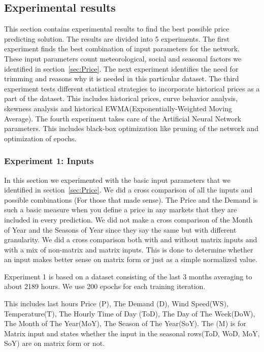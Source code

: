 \subsection{Experimental results}
This section contains experimental results to find the best possible price predicting solution. The results are divided into 5 experiments. The first experiment finds the best combination of input parameters for the network. These input parameters count meteorological, social and seasonal factors we identified in section~\ref{sec:Price}. The next experiment identifies the need for trimming and reasons why it is needed in this particular dataset. The third experiment tests different statistical strategies to incorporate historical prices as a part of the dataset. This includes historical prices, curve behavior analysis, skewness analysis and historical EWMA(Exponentially-Weighted Moving Average). The fourth experiment takes care of the Artificial Neural Network parameters. This includes black-box optimization like pruning of the network and optimization of epochs.

\subsubsection{Experiment 1: Inputs}
In this section we experimented with the basic input parameters that we identified in section~\ref{sec:Price}. We did a cross comparison of all the inputs and possible combinations (For those that made sense). The Price and the Demand is such a basic measure when you define a price in any markets that they are included in every prediction. We did not make a cross comparison of the Month of Year and the Seasons of Year since they say the same but with different granularity. We did a cross comparison both with and without matrix inputs and with a mix of non-matrix and matrix inputs. This is done to determine whether an input makes better sense on matrix form or just as a simple normalized value. 

Experiment 1 is based on a dataset consisting of the last 3 months averaging to about 2189 hours. We use 200 epochs for each training iteration.

This includes last hours Price (P), The Demand (D), Wind Speed(WS), Temperature(T), The Hourly Time of Day (ToD), The Day of The Week(DoW), The Month of The Year(MoY), The Season of The Year(SoY). The (M) is for Matrix input and states whether the input in the seasonal rows(ToD, WoD, MoY, SoY) are on matrix form or not.

